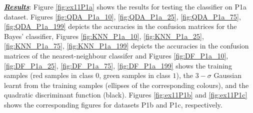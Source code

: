 \documentclass[12pt, a4 paper]{article}
\begin{document}
\underline {\it \bfseries Results}: Figure \ref{fig:ex11P1a} shows the results for testing the classifier on P1a dataset. Figures \ref{fig:QDA_P1a_10}, \ref{fig:QDA_P1a_25}, \ref{fig:QDA_P1a_75}, \ref{fig:QDA_P1a_199} depicts the accuracies in the confusion matrices for the Bayes' classifier, Figures \ref{fig:KNN_P1a_10}, \ref{fig:KNN_P1a_25}, \ref{fig:KNN_P1a_75}, \ref{fig:KNN_P1a_199} depicts the accuracies in the confusion matrices of the nearest-neighbour classifer and Figures \ref{fig:DF_P1a_10}, \ref{fig:DF_P1a_25}, \ref{fig:DF_P1a_75}, \ref{fig:DF_P1a_199} shows the training samples (red samples in class $0$, green samples in class $1$), the $3-\sigma$ Gaussian learnt from the training samples (ellipses of the corresponding colours), and the quadratic discriminant function (black). Figures \ref{fig:ex11P1b} and \ref{fig:ex11P1c} shows the corresponding figures for datasets P1b and P1c, respectively. \\
\end{document}
